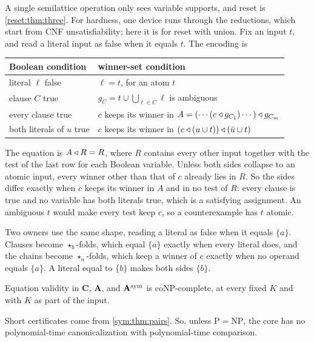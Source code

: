 \begin{idea}
A single semilattice operation only sees variable supports, and reset is \cref{reset:thm:three}. For hardness, one device runs through the reductions, which start from CNF unsatisfiability; here it is for reset with union. Fix an input $t$, and read a literal input as false when it equals $t$. The encoding is
\begin{center}
\begin{tabular}{ll}
\toprule
Boolean condition & winner-set condition\\
\midrule
literal $\ell$ false & $\ell=t$, for an atom $t$\\
clause $C$ true & $g_C=t\cup\bigcup_{\ell\in C}\ell$ is ambiguous\\
every clause true & $c$ keeps its winner in $A=(\cdots(c\mathbin{\triangleleft} g_{C_1})\cdots)\mathbin{\triangleleft} g_{C_m}$\\
both literals of $u$ true & $c$ keeps its winner in $(c\mathbin{\triangleleft}(u\cup t))\mathbin{\triangleleft}(\bar u\cup t)$\\
\bottomrule
\end{tabular}
\end{center}
The equation is $A\mathbin{\triangleleft} R=R$, where $R$ contains every other input together with the test of the last row for each Boolean variable. Unless both sides collapse to an atomic input, every winner other than that of $c$ already lies in $R$. So the sides differ exactly when $c$ keeps its winner in $A$ and in no test of $R$: every clause is true and no variable has both literals true, which is a satisfying assignment. An ambiguous $t$ would make every test keep $c$, so a counterexample has $t$ atomic.

Two owners use the same shape, reading a literal as false when it equals $\{a\}$. Clauses become $\star_b$-folds, which equal $\{a\}$ exactly when every literal does, and the chains become $\star_a$-folds, which keep a winner of $c$ exactly when no operand equals $\{a\}$. A literal equal to $\{b\}$ makes both sides $\{b\}$.
\end{idea}

\begin{corollary}\label{gen:thm:complexity}
Equation validity in $\mathbf C$, $\mathbf A$, and $\mathbf A^{\rm sym}$ is coNP-complete, at every fixed $K$ and with $K$ as part of the input.
\end{corollary}

Short certificates come from \cref{sym:thm:pairs}. So, unless $\mathrm P=\mathrm{NP}$, the core has no polynomial-time canonicalization with polynomial-time comparison.

